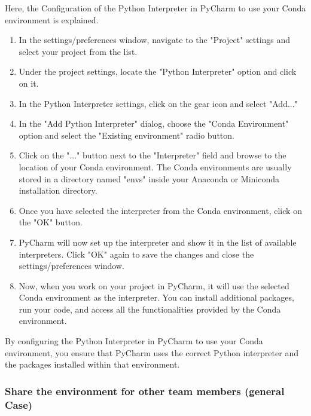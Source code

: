 Here, the Configuration of the Python Interpreter in PyCharm to use your Conda environment is explained.

\begin{enumerate}
	\item In the settings/preferences window, navigate to the "Project" settings and select your project from the list.
	
	\item Under the project settings, locate the "Python Interpreter" option and click on it.
	
	\item In the Python Interpreter settings, click on the gear icon and select "Add..."
	
	\item In the "Add Python Interpreter" dialog, choose the "Conda Environment" option and select the "Existing environment" radio button.
	
	\item Click on the "..." button next to the "Interpreter" field and browse to the location of your Conda environment. The Conda environments are usually stored in a directory named "envs" inside your Anaconda or Miniconda installation directory.
	
	\item Once you have selected the interpreter from the Conda environment, click on the "OK" button.
	
	\item PyCharm will now set up the interpreter and show it in the list of available interpreters. Click "OK" again to save the changes and close the settings/preferences window.
	
	\item Now, when you work on your project in PyCharm, it will use the selected Conda environment as the interpreter. You can install additional packages, run your code, and access all the functionalities provided by the Conda environment.
\end{enumerate}

By configuring the Python Interpreter in PyCharm to use your Conda environment, you ensure that PyCharm uses the correct Python interpreter and the packages installed within that environment.

\subsubsection{Share the environment for other team members (general Case)}

